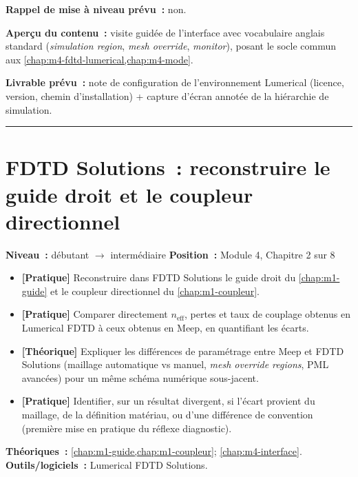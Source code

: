 \noindent\textbf{Rappel de mise à niveau prévu~:} non.

\noindent\textbf{Aperçu du contenu~:} visite guidée de l'interface avec vocabulaire anglais standard (\emph{simulation region}, \emph{mesh override}, \emph{monitor}), posant le socle commun aux \cref{chap:m4-fdtd-lumerical,chap:m4-mode}.

\noindent\textbf{Livrable prévu~:} note de configuration de l'environnement Lumerical (licence, version, chemin d'installation) + capture d'écran annotée de la hiérarchie de simulation.

\bigskip\hrule\bigskip

\chapter{FDTD Solutions~: reconstruire le guide droit et le coupleur directionnel}
\label{chap:m4-fdtd-lumerical}

\noindent\textbf{Niveau~:} débutant $\to$ intermédiaire \hfill \textbf{Position~:} Module 4, Chapitre 2 sur 8

\begin{objectifs}
\begin{itemize}[leftmargin=1.4em]
  \item \textbf{[Pratique]} Reconstruire dans FDTD Solutions le guide droit du \cref{chap:m1-guide} et le coupleur directionnel du \cref{chap:m1-coupleur}.
  \item \textbf{[Pratique]} Comparer directement $n_{\text{eff}}$, pertes et taux de couplage obtenus en Lumerical FDTD à ceux obtenus en Meep, en quantifiant les écarts.
  \item \textbf{[Théorique]} Expliquer les différences de paramétrage entre Meep et FDTD Solutions (maillage automatique vs manuel, \emph{mesh override regions}, PML avancées) pour un même schéma numérique sous-jacent.
  \item \textbf{[Pratique]} Identifier, sur un résultat divergent, si l'écart provient du maillage, de la définition matériau, ou d'une différence de convention (première mise en pratique du réflexe diagnostic).
\end{itemize}
\end{objectifs}

\begin{prerequis}
\textbf{Théoriques~:} \cref{chap:m1-guide,chap:m1-coupleur}; \cref{chap:m4-interface}.\\
\textbf{Outils/logiciels~:} Lumerical FDTD Solutions.
\end{prerequis}

